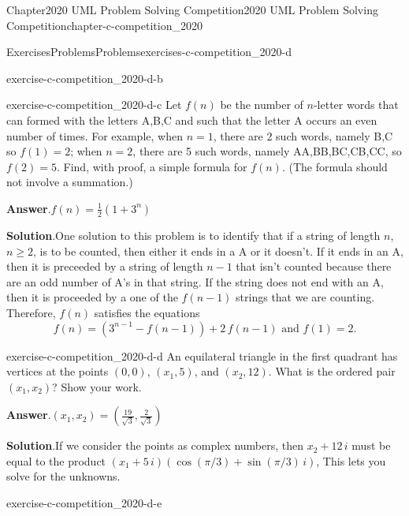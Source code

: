 \documentclass[oneside,10pt,]{book}
\newcommand{\blocktitlefont}{\relax}
\numberwithin{equation}{section}
\begin{document}
\begin{chapterptx}{Chapter}{2020 UML Problem Solving Competition}{}{2020 UML Problem Solving Competition}{}{}{chapter-c-competition_2020}
\begin{exercises-section}{Exercises}{Problems}{}{Problems}{}{}{exercises-c-competition_2020-d}
\begin{divisionexercise}{1}{}{}{exercise-c-competition_2020-d-b}
\end{divisionexercise}%
\begin{divisionexercise}{2}{}{}{exercise-c-competition_2020-d-c}%
Let \(f(n)\) be the number of \(n\)-letter words that can formed with the letters A,B,C and such that the letter A occurs an even number of times. For example, when \(n = 1\), there are 2 such words, namely B,C so \(f (1) = 2\); when \(n = 2\), there are 5 such words, namely AA,BB,BC,CB,CC, so \(f(2) = 5\). Find, with proof, a simple formula for \(f(n)\). (The formula should not involve a summation.)%
\par\smallskip%
\noindent\textbf{\blocktitlefont Answer}.\hypertarget{answer-c-competition_2020-d-c-b}{}\quad{}\(f(n)= \frac{1}{2} \left(1+3^n\right)\)%
\par\smallskip%
\noindent\textbf{\blocktitlefont Solution}.\hypertarget{solution-c-competition_2020-d-c-c}{}\quad{}One solution to this problem is to identify that if a string of length \(n\), \(n \geq 2\), is to be counted, then either it ends in a A or it doesn't. If it ends in an A, then it is preceeded by a string of length \(n-1\) that isn't counted because there are an odd number of A's in that string.   If the string does not end with an A, then it is proceeded by a one of the \(f(n-1)\) strings that we are counting.  Therefore, \(f(n)\) satisfies the equations%
\begin{equation*}
f(n)= (3^{n-1} -f(n-1))+ 2\,f(n-1) \textrm{   and    } f(1)=2\text{.}
\end{equation*}
%
\end{divisionexercise}%
\begin{divisionexercise}{3}{}{}{exercise-c-competition_2020-d-d}%
An equilateral triangle in the first quadrant has vertices at the points \((0, 0)\), \((x_1, 5)\), and \((x_2, 12)\). What is the ordered pair \((x_1, x_2)\)?  Show your work.%
\par\smallskip%
\noindent\textbf{\blocktitlefont Answer}.\hypertarget{answer-c-competition_2020-d-d-b}{}\quad{}\((x_1,x_2)=(\frac{19}{\sqrt{3}},\frac{2}{\sqrt{3}})\)%
\par\smallskip%
\noindent\textbf{\blocktitlefont Solution}.\hypertarget{solution-c-competition_2020-d-d-c}{}\quad{}If we consider the points as complex numbers, then \(x_2 + 12\,i\) must be equal to the product  \((x_1 + 5\,i)(\cos{(\pi/3)} + \sin{(\pi/3)} \,i)\),  This lets you solve for the unknowns.%
\end{divisionexercise}%
\begin{divisionexercise}{4}{}{}{exercise-c-competition_2020-d-e}%

\end{divisionexercise}
\end{exercises-section}
\end{chapterptx}
\end{document}
